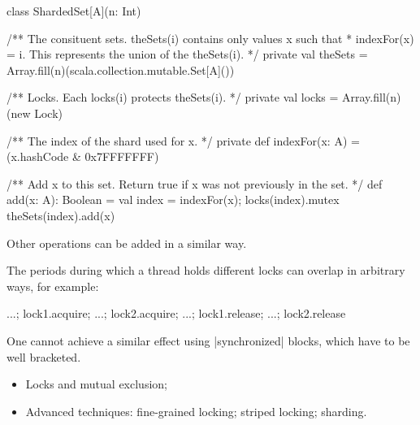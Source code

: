 \documentclass[notes,color]{sepslide0}
\begin{document}

\begin{slide}

\begin{scala}
class ShardedSet[A](n: Int){
  /** The consituent sets.  theSets(i) contains only values x such that
    * indexFor(x) = i.  This represents the union of the theSets(i). */
  private val theSets = Array.fill(n)(scala.collection.mutable.Set[A]())

  /** Locks.  Each locks(i) protects theSets(i). */
  private val locks = Array.fill(n)(new Lock)

  /** The index of the shard used for x. */
  private def indexFor(x: A) = (x.hashCode & 0x7FFFFFFF) %

  /** Add x to this set.  Return true if x was not previously in the set. */
  def add(x: A): Boolean = {
    val index = indexFor(x); locks(index).mutex{ theSets(index).add(x) }
  }
}
\end{scala}
%
Other operations can be added in a similar way. 
\end{slide}


\begin{slide}

The periods during which a thread holds different locks can overlap in
arbitrary ways, for example:
%
\begin{scala}
  ...; lock1.acquire; ...; lock2.acquire; ...; lock1.release; ...; lock2.release
\end{scala}
%
One cannot achieve a similar effect using |synchronized| blocks, which have to
be well bracketed.
\end{slide}


\begin{slide}

\begin{itemize}
\item Locks and mutual exclusion;

\item Advanced techniques: fine-grained locking; striped locking; sharding. 
\end{itemize}
\end{slide}

\end{document}
